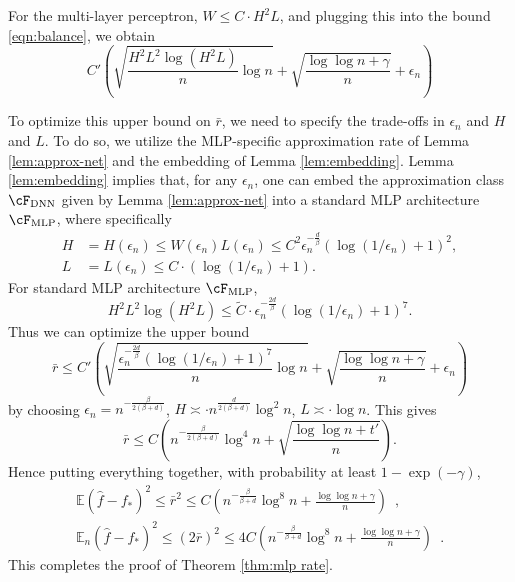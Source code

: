 \documentclass[11pt]{article}
\numberwithin{equation}{section}
\theoremstyle{definition}
\newcommand{\E}{\mathbb{E}}
\begin{document}
\begin{appendices}
	
For the multi-layer perceptron, $W \leq C \cdot H^2 L$, and plugging this into the bound \eqref{eqn:balance}, we obtain
\[
	C' \left( \sqrt{ \frac{H^2 L^2 \log (H^2 L)}{n}\log n} + \sqrt{\frac{\log \log n + \gamma}{n}} + \epsilon_n  \right)
\]
	
To optimize this upper bound on $\bar{r}$, we need to specify the trade-offs in $\epsilon_n$ and $H$ and $L$. To do so, we utilize the MLP-specific approximation rate of Lemma \ref{lem:approx-net} and the embedding of Lemma \ref{lem:embedding}. Lemma \ref{lem:embedding} implies that, for any $\epsilon_n$, one can embed the approximation class $\cF_{\rm DNN}$ given by Lemma \ref{lem:approx-net} into a standard MLP architecture $\cF_{\rm MLP}$, where specifically
\begin{align*}
	H & = H(\epsilon_n) \leq W(\epsilon_n) L(\epsilon_n) \leq C^2  \epsilon_n^{-\frac{d}{\beta}} ( \log (1/\epsilon_n) + 1)^2, \\
	L & = L(\epsilon_n) \leq C \cdot ( \log (1/\epsilon_n) + 1).
\end{align*}
For standard MLP architecture $\cF_{\rm MLP}$, 
\[
	H^2 L^2 \log (H^2 L) \leq \tilde{C} \cdot \epsilon_n^{-\frac{2d}{\beta}} ( \log (1/\epsilon_n) + 1)^7.
\]
Thus we can optimize the upper bound
\[ 
	\bar{r} \leq C' \left( \sqrt{ \frac{\epsilon_n^{-\frac{2d}{\beta}} ( \log (1/\epsilon_n) + 1)^7 }{n}\log n} + \sqrt{\frac{\log \log n + \gamma}{n}} + \epsilon_n  \right)
\]
by choosing $\epsilon_n = n^{-\frac{\beta}{2(\beta+d)}}$, $H \asymp \cdot n^{\frac{d}{2(\beta + d)}} \log^2 n$, $L \asymp \cdot \log n$. This gives
\[
	\bar{r} \leq C  \left( n^{-\frac{\beta}{2(\beta+d)}} \log^4 n + \sqrt{\frac{\log \log n + t'}{n}} \right).
\]
Hence putting everything together, with probability at least $1 - \exp(-\gamma)$,
\begin{align*}
	\E (\hat{f} - f_* )^2 \leq \bar{r}^2 \leq  C  \left( n^{-\frac{\beta}{\beta+d}} \log^8 n + \frac{\log \log n + \gamma}{n} \right) \enspace, \\
	\E_n (\hat{f} - f_* )^2  \leq (2\bar{r})^2 \leq 4C \left( n^{-\frac{\beta}{\beta+d}} \log^8 n + \frac{\log \log n + \gamma}{n} \right) \enspace.
\end{align*}
This completes the proof of Theorem \ref{thm:mlp rate}.


	
	
	
	
	
	
	
	
	
	

\end{appendices}
\end{document}
